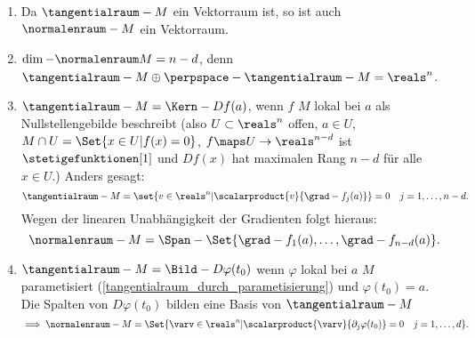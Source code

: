 \begin{bemerkungen*}
  \begin{enumerate}
    \item Da \( \tangentialraum-{M} \) ein Vektorraum ist, so ist auch \( \normalenraum-{M} \) ein Vektorraum.
    \item \( \dim-{\normalenraum}{M}=n-d \), denn \( \tangentialraum-{M}\oplus \perpspace-{\tangentialraum-{M}}=\reals^n \).
    \item \( \tangentialraum-{M}=\Kern-{Df(a)} \), wenn \( f \) \( M \) lokal bei \( a \) als Nullstellengebilde beschreibt (also \texists  \( U\subset \reals^n \) offen, \( a\in U \), \sd \( M\cap U=\Set{x\in U|f(x)=0} \), \( f\maps U\to \reals^{n-d} \) ist \( \stetigefunktionen[1] \) und \( Df(x) \) hat maximalen Rang \( n-d \) für alle \( x\in U \).) Anders gesagt: 
    \begin{equation*}
      \tangentialraum-{M}=\set{v\in \reals^n|\scalarproduct{v}{\grad-{f_j}(a)}}=0\quad j=1,\dotsc,n-d.
    \end{equation*}
    Wegen der linearen Unabhängigkeit der Gradienten folgt hieraus:
    \begin{equation*}
      \normalenraum-{M}=\Span-{\Set{\grad-{f_1}(a),\dotsc,\grad-{f_{n-d}}(a)}}.
    \end{equation*}
    \item \( \tangentialraum-{M}=\Bild-{D\varphi(t_0)} \) wenn \( \varphi \) lokal bei \( a \) \( M \) parametisiert (\vgl \ref{tangentialraum_durch_parametisierung}) und \( \varphi(t_0)=a \). Die Spalten von \( D\varphi(t_0) \) bilden eine Basis von \( \tangentialraum-{M} \)
    \begin{equation*}
      \implies \normalenraum-{M}=\Set{\varv\in \reals^n|\scalarproduct{\varv}{\partial_j \varphi(t_0)}=0\quad j=1,\dotsc,d}.
    \end{equation*}
  \end{enumerate}
\end{bemerkungen*}
